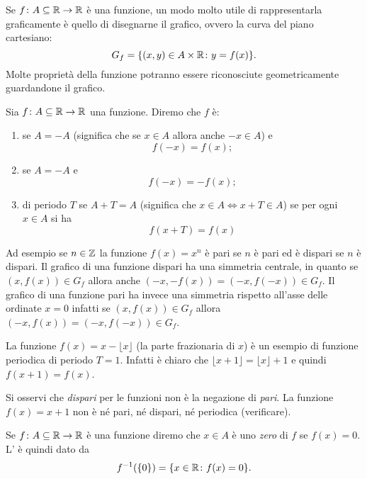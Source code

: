 Se $f\colon A \subseteq \mathbb R\to \mathbb R$ è una funzione, un modo molto
utile di rappresentarla graficamente è quello di disegnarne il
grafico, ovvero la curva del piano cartesiano:
\[
   G_f = {\left\{ (x,y)\in A\times \mathbb R\colon y = f(x) \right\}}.
\]
Molte proprietà della funzione potranno essere riconosciute
geometricamente guardandone il grafico.

\begin{definition}[simmetrie]
Sia $f\colon A \subseteq \mathbb R \to \mathbb R$ una funzione.
Diremo che $f$ è:
\begin{enumerate}
\item {}
%
se $A=-A$ (significa che se $x\in A$ allora anche $-x\in A$) e
\[
  f(-x) = f(x);
\]
\item {}
%
se $A=-A$ e
\[
  f(-x) = -f(x);
\]
\item {}
%
di periodo $T$ se $A+T=A$
(significa che $x\in A \iff x+T \in A$)
se per ogni $x\in A$ si ha
\[
  f(x+T)=f(x)
\]
\end{enumerate}
\end{definition}

Ad esempio se $n\in \mathbb Z$ la funzione $f(x)=x^n$
è pari se $n$ è pari ed è dispari se $n$ è dispari.
Il grafico di una funzione dispari ha una simmetria
centrale, in quanto se $(x,f(x))\in G_f$ allora
anche $(-x,-f(x)) = (-x,f(-x))\in G_f$.
Il grafico di una funzione pari ha invece una
simmetria rispetto all'asse delle ordinate $x=0$
infatti se $(x,f(x))\in G_f$ allora $(-x,f(x)) = (-x,f(-x)) \in G_f$.

La funzione $f(x) = x - \lfloor x\rfloor$ (la parte frazionaria di $x$)
è un esempio di funzione periodica di periodo $T=1$. Infatti
è chiaro che $\lfloor x+1\rfloor = \lfloor x \rfloor +1$ e quindi
$f(x+1)=f(x)$.

Si osservi che \emph{dispari} per le funzioni non è la negazione
di \emph{pari}.
La funzione $f(x) = x+1$ non è né pari, né dispari, né periodica
(verificare).

\begin{definition}[zeri]
  Se $f\colon A\subseteq \mathbb R \to \mathbb R$ è una funzione diremo che
  $x\in A$ è uno \emph{zero} di $f$ se $f(x)=0$.
  L'
  è quindi dato da
  \[
    f^{-1}({\left\{ 0 \right\}}) = {\left\{ x\in \mathbb R\colon f(x) = 0 \right\}}.
  \]
\end{definition}

